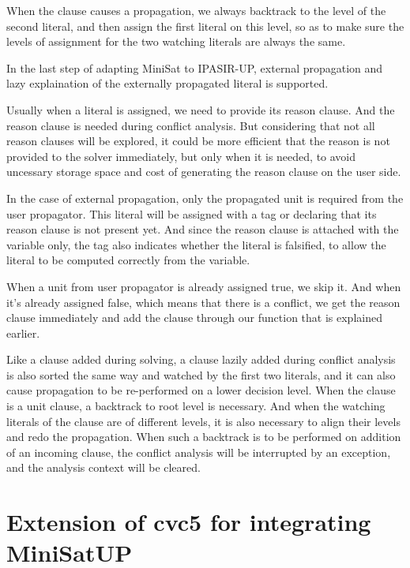 When the clause causes a propagation, we always backtrack to the level of the second literal, and then assign the first literal on this level, so as to make sure the levels of assignment for the two watching literals are always the same.


In the last step of adapting MiniSat to IPASIR-UP, external propagation and lazy explaination of the externally propagated literal is supported.

Usually when a literal is assigned, we need to provide its reason clause. And the reason clause is needed during conflict analysis. But considering that not all reason clauses will be explored, it could be more efficient that the reason is not provided to the solver immediately, but only when it is needed, to avoid uncessary storage space and cost of generating the reason clause on the user side.

In the case of external propagation, only the propagated unit is required from the user propagator. This literal will be assigned with a tag  or  declaring that its reason clause is not present yet. And since the reason clause is attached with the variable only, the tag also indicates whether the literal is falsified, to allow the literal to be computed correctly from the variable.

When a unit from user propagator is already assigned true, we skip it. And when it's already assigned false, which means that there is a conflict, we get the reason clause immediately and add the clause through our function  that is explained earlier.

Like a clause added during solving, a clause lazily added during conflict analysis is also sorted the same way and watched by the first two literals, and it can also cause propagation to be re-performed on a lower decision level. When the clause is a unit clause, a backtrack to root level is necessary. And when the watching literals of the clause are of different levels, it is also necessary to align their levels and redo the propagation. When such a backtrack is to be performed on addition of an incoming clause, the conflict analysis will be interrupted by an exception, and the analysis context will be cleared.

\section{Extension of cvc5 for integrating MiniSatUP}


